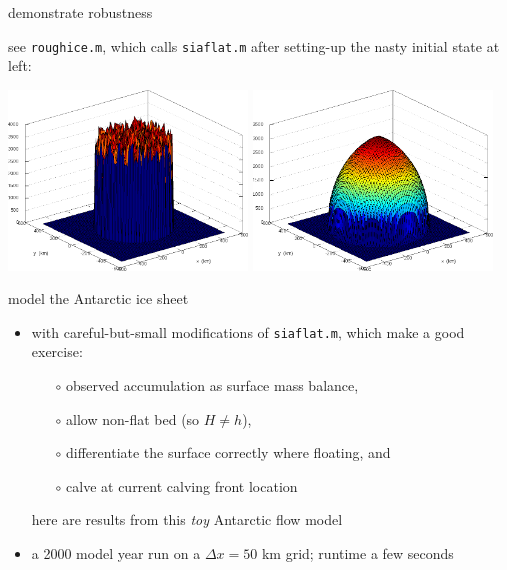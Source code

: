 \documentclass[titlepage,letterpaper,final,12pt]{scrartcl}
\begin{document}
demonstrate robustness

see \texttt{roughice.m}, which calls \texttt{siaflat.m} after setting-up the nasty initial state at left:

\includegraphics[width=2.5in]{roughinitial}
\quad
\includegraphics[width=2.5in]{roughfinal}



model the Antarctic ice sheet

\begin{itemize}
\item with careful-but-small modifications of \texttt{siaflat.m}, which make a good exercise:
  \begin{itemize}
  \item[$\circ$] observed accumulation as surface mass balance,
  \item[$\circ$] allow non-flat bed (so $H\ne h$),
  \item[$\circ$] differentiate the surface correctly where floating, and
  \item[$\circ$] calve at current calving front location
  \end{itemize}
here are results from this \emph{toy} Antarctic flow model
\item a 2000 model year run on a $\Delta x=50$ km grid; runtime a few seconds
\end{itemize}
\end{document}
